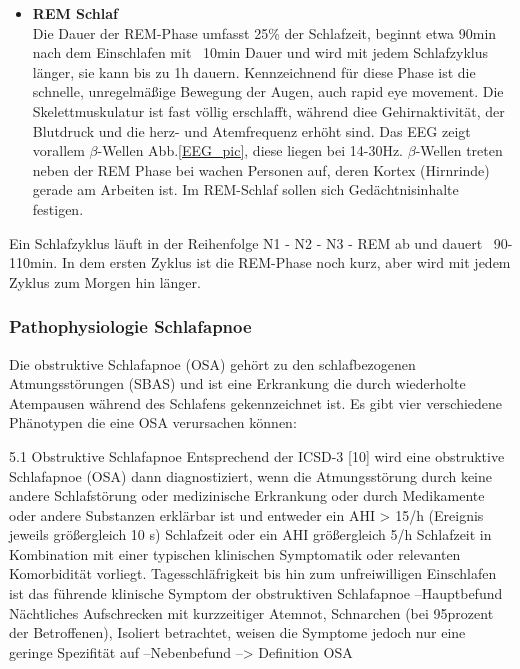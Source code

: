 \documentclass[a4paper, 12pt]{article}
\begin{document}
\begin{itemize}
\item \textbf{REM Schlaf}\\
Die Dauer der REM-Phase umfasst 25\% der Schlafzeit, beginnt etwa 90min nach dem Einschlafen mit ~10min Dauer und wird mit jedem Schlafzyklus länger, sie kann bis zu 1h dauern. Kennzeichnend für diese Phase ist die schnelle, unregelmäßige Bewegung der Augen, auch rapid eye movement. Die Skelettmuskulatur ist fast völlig erschlafft, während diee Gehirnaktivität, der Blutdruck und die herz- und Atemfrequenz erhöht sind. Das EEG zeigt vorallem \(\beta\)-Wellen Abb.\ref{EEG_pic}, diese liegen bei 14-30Hz. \(\beta\)-Wellen treten neben der REM Phase bei wachen Personen auf, deren Kortex (Hirnrinde) gerade am Arbeiten ist. Im REM-Schlaf sollen sich Gedächtnisinhalte festigen. \cite{flexikon}

\end{itemize}

Ein Schlafzyklus läuft in der Reihenfolge N1 - N2 - N3 - REM ab und dauert ~90-110min. In dem ersten Zyklus ist die REM-Phase noch kurz, aber wird mit jedem Zyklus zum Morgen hin länger.  \cite{phys_sleep_stages}

\subsubsection{Pathophysiologie Schlafapnoe}\label{schlafapnoe}
Die obstruktive Schlafapnoe (OSA) gehört zu den schlafbezogenen Atmungsstörungen (SBAS) und ist eine Erkrankung die durch wiederholte Atempausen während des Schlafens gekennzeichnet ist. Es gibt vier verschiedene Phänotypen die eine OSA verursachen können:

5.1 Obstruktive Schlafapnoe
Entsprechend der ICSD-3 [10] wird eine
obstruktive Schlafapnoe (OSA) dann diagnostiziert, wenn die Atmungsstörung
durch keine andere Schlafstörung oder
medizinische Erkrankung oder durch
Medikamente oder andere Substanzen
erklärbar ist und entweder ein AHI >
15/h (Ereignis jeweils größergleich 10 s) Schlafzeit oder ein AHI größergleich 5/h Schlafzeit in
Kombination mit einer typischen klinischen Symptomatik oder relevanten
Komorbidität vorliegt. 
Tagesschläfrigkeit bis hin zum unfreiwilligen Einschlafen ist das führende klinische Symptom der obstruktiven Schlafapnoe --Hauptbefund
Nächtliches Aufschrecken mit kurzzeitiger Atemnot, Schnarchen (bei 95prozent der Betroffenen),  Isoliert betrachtet, weisen die Symptome jedoch nur eine geringe Spezifität auf  --Nebenbefund
--> Definition OSA
\end{document}
